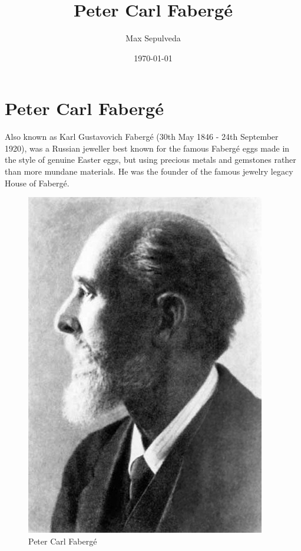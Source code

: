 \documentclass[11pt,letterpaper,final,onecolumn]{article}
\title{Peter Carl Fabergé}
\date{\today}
\author{Max Sepulveda}
\begin{document}
\maketitle

\nocite{CalafateFloraChilena}
\nocite{ThePlantList}
\nocite{LeyendaCalafate}


\section{Peter Carl Fabergé}

Also known as Karl Gustavovich Fabergé (30th May 1846 - 24th September 1920), was a Russian jeweller best known for the famous Fabergé eggs made in the style of genuine Easter eggs, but using precious metals and gemstones rather than more mundane materials. He was the founder of the famous jewelry legacy House of Fabergé.

 \begin{figure}[hbt]
  \centering
   \includegraphics[scale=0.2]{Karl_Gustavovich_Faberge} 
   \caption{Peter Carl Fabergé}
   \label{fig:faberger}
 \end{figure}
\end{document}
